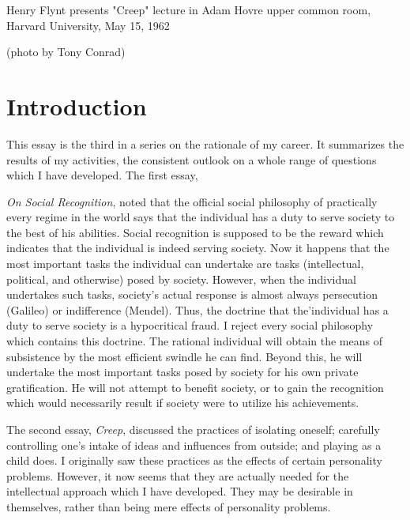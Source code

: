\documentclass[10pt,twoside,draft]{memoir}
\newcommand{\essaytitle}[1]{
	\emph{#1}}
\begin{document}
\graphicspath{{img/}}
\pagestyle{ruled}

{
\thispagestyle{empty}

Henry Flynt presents "Creep" lecture in Adam Hovre upper common room, Harvard 
University, May 15, 1962 


(photo by Tony Conrad) 
\clearpage
}

\tableofcontents*

\mainmatter

\chapter{Introduction}


This essay is the third in a series on the rationale of my career. It 
summarizes the results of my activities, the consistent outlook on a whole 
range of questions which I have developed. The first essay, 
\essaytitle{On Social Recognition}, noted that the official social philosophy of practically every 
regime in the world says that the individual has a duty to serve society to the 
best of his abilities. Social recognition is supposed to be the reward which 
indicates that the individual is indeed serving society. Now it happens that 
the most important tasks the individual can undertake are tasks (intellectual, 
political, and otherwise) posed by society. However, when the individual 
undertakes such tasks, society's actual response is almost always persecution 
(Galileo) or indifference (Mendel). Thus, the doctrine that the'individual has 
a duty to serve society is a hypocritical fraud. I reject every social 
philosophy which contains this doctrine. The rational individual will obtain 
the means of subsistence by the most efficient swindle he can find. Beyond 
this, he will undertake the most important tasks posed by society for his 
own private gratification. He will not attempt to benefit society, or to gain 
the recognition which would necessarily result if society were to utilize his 
achievements. 

The second essay, \essaytitle{Creep}, discussed the practices of isolating oneself; 
carefully controlling one's intake of ideas and influences from outside; and 
playing as a child does. I originally saw these practices as the effects of 
certain personality problems. However, it now seems that they are actually 
needed for the intellectual approach which I have developed. They may be 
desirable in themselves, rather than being mere effects of personality 
problems. 
\end{document}
